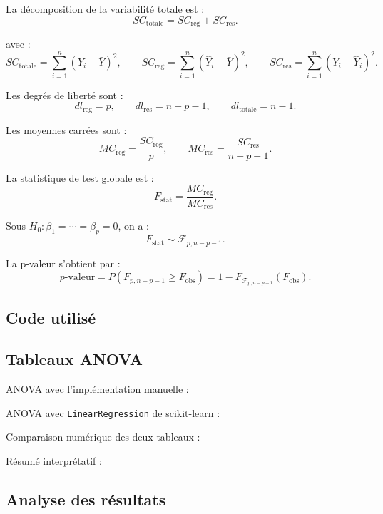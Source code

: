 \documentclass[12pt,letterpaper]{article}
\begin{document}
La décomposition de la variabilité totale est :
\[
SC_{\text{totale}} = SC_{\text{reg}} + SC_{\text{res}}.
\]

avec :
\[
SC_{\text{totale}} = \sum_{i=1}^n (Y_i - \bar{Y})^2,
\qquad
SC_{\text{reg}} = \sum_{i=1}^n (\hat{Y}_i - \bar{Y})^2,
\qquad
SC_{\text{res}} = \sum_{i=1}^n (Y_i - \hat{Y}_i)^2.
\]

Les degrés de liberté sont :
\[
dl_{\text{reg}} = p, \qquad dl_{\text{res}} = n - p - 1, \qquad dl_{\text{totale}} = n - 1.
\]

Les moyennes carrées sont :
\[
MC_{\text{reg}} = \frac{SC_{\text{reg}}}{p},
\qquad
MC_{\text{res}} = \frac{SC_{\text{res}}}{n-p-1}.
\]

La statistique de test globale est :
\[
F_{\text{stat}} = \frac{MC_{\text{reg}}}{MC_{\text{res}}}.
\]

Sous $H_0 : \beta_1 = \cdots = \beta_p = 0$, on a :
\[
F_{\text{stat}} \sim \mathcal{F}_{p,n-p-1}.
\]

La p-valeur s'obtient par :
\[
p\text{-valeur} = P\left(F_{p,n-p-1} \geq F_{\text{obs}}\right)
= 1 - F_{\mathcal{F}_{p,n-p-1}}(F_{\text{obs}}).
\]

\subsection{Code utilisé}



\subsection{Tableaux ANOVA}

ANOVA avec l'implémentation manuelle :


ANOVA avec \texttt{LinearRegression} de scikit-learn :


Comparaison numérique des deux tableaux :


Résumé interprétatif :


\subsection{Analyse des résultats}
\end{document}
